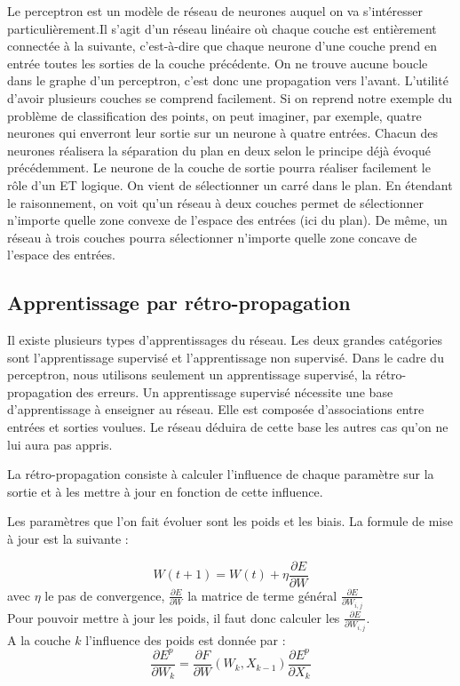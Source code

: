 Le perceptron est un modèle de réseau de neurones auquel on va s’intéresser particulièrement.Il s'agit d'un réseau linéaire où chaque couche est entièrement connectée à la suivante, c'est-à-dire que chaque neurone d'une couche prend en entrée toutes les sorties de la couche précédente. On ne trouve aucune boucle dans le graphe d'un perceptron, c'est donc une propagation vers l'avant.
L’utilité d’avoir plusieurs couches se comprend facilement. Si on reprend notre exemple du problème de classification des points, on peut imaginer, par exemple, quatre neurones qui enverront leur sortie sur un neurone à quatre entrées. Chacun des neurones réalisera la séparation du plan en deux selon le principe déjà évoqué précédemment. Le neurone de la couche de sortie pourra réaliser facilement le rôle d’un ET logique. On vient de sélectionner un carré dans le plan. En étendant le raisonnement, on voit qu’un réseau à deux couches permet de sélectionner n’importe quelle zone convexe de l’espace des entrées (ici du plan). De même, un réseau à trois couches pourra sélectionner n’importe quelle zone concave de l’espace des entrées.






\subsection{Apprentissage par rétro-propagation}

Il existe plusieurs types d'apprentissages du réseau. Les deux grandes catégories sont l'apprentissage supervisé et l'apprentissage non supervisé. 
Dans le cadre du perceptron, nous utilisons seulement un apprentissage supervisé, la rétro-propagation des erreurs. Un apprentissage supervisé nécessite une base d'apprentissage à enseigner au réseau. Elle est composée d'associations entre entrées et sorties voulues. Le réseau déduira de cette base les autres cas qu'on ne lui aura pas appris. 

La rétro-propagation consiste à calculer l’influence de chaque paramètre sur la sortie et à les mettre à jour en fonction de cette influence.

Les paramètres que l’on fait évoluer sont les poids et les biais.
La formule de mise à jour est la suivante :

\[
W(t+1) = W(t) + \eta \frac{\partial E}{\partial W} 
\]
avec $\eta$ le pas de convergence, $\frac{\partial E}{\partial W} $ la matrice de terme général $\frac{\partial E}{\partial W_{i,j}} $\\
Pour pouvoir mettre à jour les poids, il faut donc calculer les $\frac{\partial E}{\partial W_{i,j}} $.\\
A la couche $k$ l'influence des poids est donnée par : 
\[
	\frac{\partial E^p}{\partial W _k} = \frac{\partial F}{\partial W}(W_k, X_{k-1})\frac{\partial E^p}{\partial X_k}
\]

